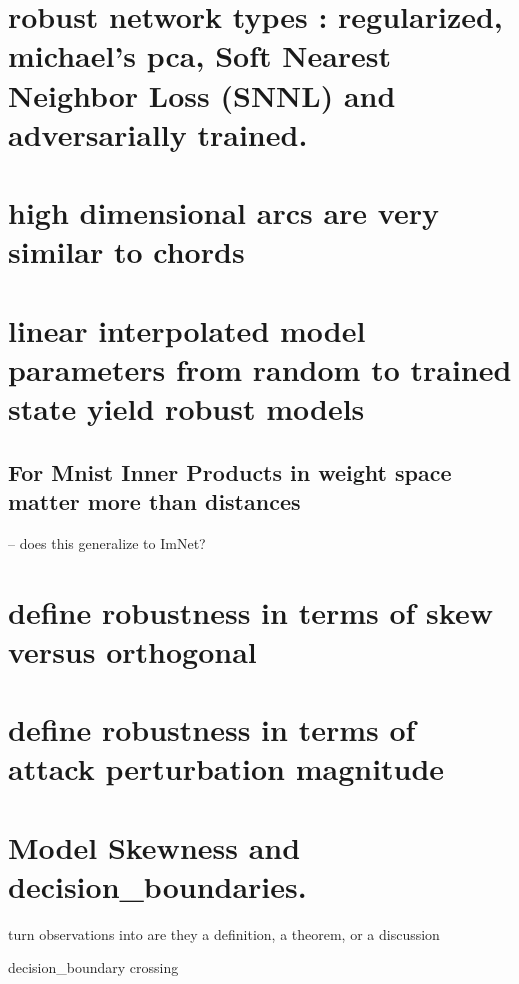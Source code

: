 \documentclass[10pt]{extarticle}
\begin{document}
\section{robust network types : regularized, michael's pca, Soft Nearest Neighbor Loss (SNNL) and
adversarially trained. }
\section{high dimensional arcs are very similar to chords}
\section{linear interpolated model parameters from random to trained
state yield robust models}
\subsection{For Mnist Inner Products in weight space matter more than
distances} -- does this generalize to ImNet?
\section{define robustness in terms of skew versus orthogonal}
\section{define robustness in terms of attack perturbation magnitude}
\section{Model Skewness and decision\_boundaries. }

turn observations into are they a definition, a theorem, or a discussion

decision\_boundary crossing


%

\end{document}
